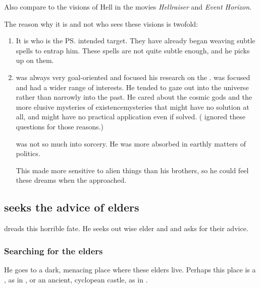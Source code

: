 Also compare to the visions of Hell in the movies \emph{Hellraiser} and \emph{Event Horizon}. 

The reason why it is \Ishnaruchaefir{} and not \Secherdamon{} who sees these visions is twofold:

\begin{enumerate}
  \item 
    It is \Ishnaruchaefir{} who is the \ps{\resphain} intended target.  
    They have already began weaving subtle spells to entrap him. 
    These spells are not quite subtle enough, and he picks up on them. 
  \item 
    \Secherdamon{} was always very goal-oriented and focused his research on the \xss. 
    \Ishnaruchaefir{} was focused and had a wider range of interests. 
    He tended to gaze out into the universe rather than narrowly into the \psp{\dragons}{} past. 
    He cared about the cosmic gods and the more elusive mysteries of existence\dash mysteries that might have no solution at all, and might have no practical application even if solved. 
    (\Secherdamon{} ignored these questions for those reasons.)
    
    \Nexagglachel{} was not so much into sorcery. 
    He was more absorbed in earthly matters of politics. 
    
    This made \Ishnaruchaefir{} more sensitive to alien things than his brothers, so he could feel these dreams when the \resphain{} approached. 
\end{enumerate}








\subsection{\Ishnaruchaefir{} seeks the advice of elders}
\Ishnaruchaefir{} dreads this horrible fate. 
He seeks out wise elder \ophidians{} and \nagalords{} and asks for their advice. 



\subsubsection{Searching for the elders}
He goes to a dark, menacing place where these elders live. 
Perhaps this place is a , as in , or an ancient, cyclopean castle, as in .

